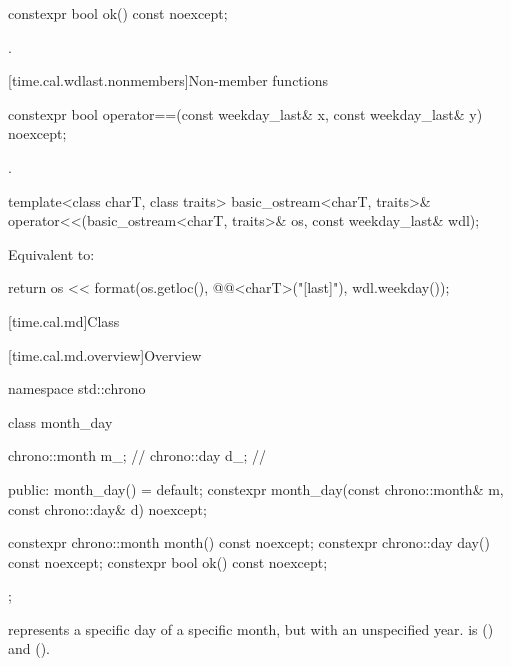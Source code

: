%
\begin{itemdecl}
constexpr bool ok() const noexcept;
\end{itemdecl}

\begin{itemdescr}
\pnum
\returns
{}.
\end{itemdescr}

[time.cal.wdlast.nonmembers]{Non-member functions}

%
\begin{itemdecl}
constexpr bool operator==(const weekday_last& x, const weekday_last& y) noexcept;
\end{itemdecl}

\begin{itemdescr}
\pnum
\returns
{}.
\end{itemdescr}

%
\begin{itemdecl}
template<class charT, class traits>
  basic_ostream<charT, traits>&
    operator<<(basic_ostream<charT, traits>& os, const weekday_last& wdl);
\end{itemdecl}

\begin{itemdescr}
\pnum
\effects
Equivalent to:
\begin{codeblock}
return os << format(os.getloc(), @@<charT>("{}[last]"), wdl.weekday());
\end{codeblock}
\end{itemdescr}

[time.cal.md]{Class }

[time.cal.md.overview]{Overview}

\begin{codeblock}
namespace std::chrono {
  class month_day {
    chrono::month m_;           // \expos
    chrono::day   d_;           // \expos

  public:
    month_day() = default;
    constexpr month_day(const chrono::month& m, const chrono::day& d) noexcept;

    constexpr chrono::month month() const noexcept;
    constexpr chrono::day   day()   const noexcept;
    constexpr bool ok() const noexcept;
  };
}
\end{codeblock}

\pnum
{} represents a specific day of a specific month,
but with an unspecified year.
 is  ()
and  ().

